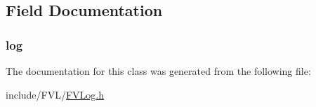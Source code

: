 \subsection{Field Documentation}
\hypertarget{classFVL_1_1FVLog_a26719ee434a67441439cfc521cb8d2a3}{
\subsubsection[{log}]{ {\bf log}}}
\label{de/dc4/classFVL_1_1FVLog_a26719ee434a67441439cfc521cb8d2a3}


The documentation for this class was generated from the following file:\begin{DoxyCompactItemize}
\item 
include/FVL/\hyperlink{FVLog_8h}{FVLog.h}\end{DoxyCompactItemize}

